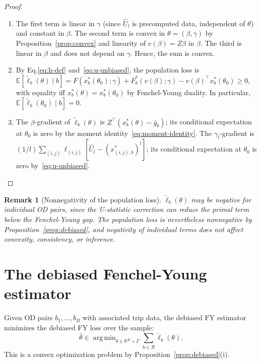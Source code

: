 \documentclass[12pt]{article}
\newcommand{\cB}{\mathcal{B}}
\DeclareMathOperator*{\argmin}{arg\,min}
\newtheorem{remark}{Remark}
\begin{document}
\begin{proof}
\begin{enumerate}
    \item[(i)] The first term is linear in $\gamma$ (since $\hat{U}_l$ is precomputed data, independent of $\theta$) and constant in $\beta$.
The second term is convex in $\theta = (\beta, \gamma)$ by Proposition~\ref{prop:convex} and linearity of $v(\beta) = Z\beta$ in $\beta$. The third is linear in $\beta$ and does not depend on $\gamma$. Hence, the sum is convex.

\item[(ii)] By Eq.\eqref{eq:h-def} and~\eqref{eq:u-unbiased}, the population loss is
    $\mathbb{E}[\tilde{\ell}_b(\theta) \mid b]
    = F(x^*_b(\theta_0); \gamma) + F^*_b(v(\beta); \gamma)
    - v(\beta)^\top x^*_b(\theta_0)
    \geq 0$, with equality iff $x^*_b(\theta) = x^*_b(\theta_0)$ by Fenchel-Young duality.
    In particular, $\mathbb{E}[\tilde{\ell}_b(\theta_0) \mid b] = 0$.

    
    \item[(iii)] The $\beta$-gradient of $\tilde{\ell}_b(\theta)$ is $Z^\top(x^*_b(\theta) - \bar{y}_b)$; its conditional expectation at $\theta_0$ is zero by the moment identity~\eqref{eq:moment-identity}. The $\gamma_l$-gradient is $(1/l) \sum_{(i,j)} \ell_{(i,j)} [\hat{U}_l - (x^*_{(i,j),b})^l]$; its conditional expectation at $\theta_0$ is zero by~\eqref{eq:u-unbiased}.
\end{enumerate}
\end{proof}

\begin{remark}[Nonnegativity of the population loss]
$\tilde{\ell}_b(\theta)$ may be negative for individual OD pairs, since the U-statistic correction can reduce the primal term below the Fenchel-Young gap. The population loss is nevertheless nonnegative by Proposition~\ref{prop:debiased}, and negativity of individual terms does not affect convexity, consistency, or inference.
\end{remark}

\section{The debiased Fenchel-Young estimator}\label{sec:estimator}

Given OD pairs $b_1, \ldots, b_B$ with associated trip data, the debiased FY estimator minimizes the debiased FY loss over the sample:
\begin{equation}\label{eq:estimator}
    \hat{\theta} \in \argmin_{\theta \in \mathbb{R}^K \times
        \Gamma} \sum_{b \in \cB}
        \tilde{\ell}_b(\theta).
\end{equation}
This is a convex optimization problem by Proposition~\ref{prop:debiased}(i).
\end{document}
